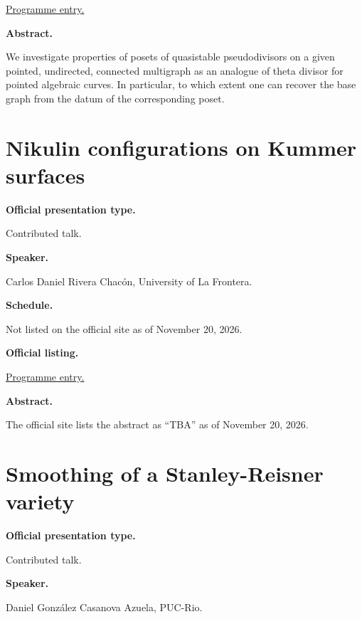 \href{%
https://sites.google.com/view/%
geoalgcompluff/legal/%
legal-2027-resumos#h.dant8g3oe5ea%
}{Programme entry.}

\medskip\noindent
{\bf Abstract.}

We investigate properties of posets of
quasistable pseudodivisors on a given
pointed, undirected, connected multigraph as
an analogue of theta divisor for pointed
algebraic curves. In particular, to which
extent one can recover the base graph from
the datum of the corresponding poset.

\section{Nikulin configurations on Kummer
surfaces}
\label{section-nikulin-configurations-on}

\medskip\noindent
{\bf Official presentation type.}

Contributed talk.

\medskip\noindent
{\bf Speaker.}

Carlos Daniel Rivera Chacón, University of La
Frontera.

\medskip\noindent
{\bf Schedule.}

Not listed on the official site as of
November 20, 2026.

\medskip\noindent
{\bf Official listing.}

\href{%
https://sites.google.com/view/%
geoalgcompluff/legal/%
legal-2027-resumos#h.dant8g3oe5ea%
}{Programme entry.}

\medskip\noindent
{\bf Abstract.}

The official site lists the abstract
as ``TBA'' as of November 20, 2026.

\section{Smoothing of a Stanley-Reisner
variety}
\label{section-smoothing-of-a-stanley}

\medskip\noindent
{\bf Official presentation type.}

Contributed talk.

\medskip\noindent
{\bf Speaker.}

Daniel González Casanova Azuela, PUC-Rio.

